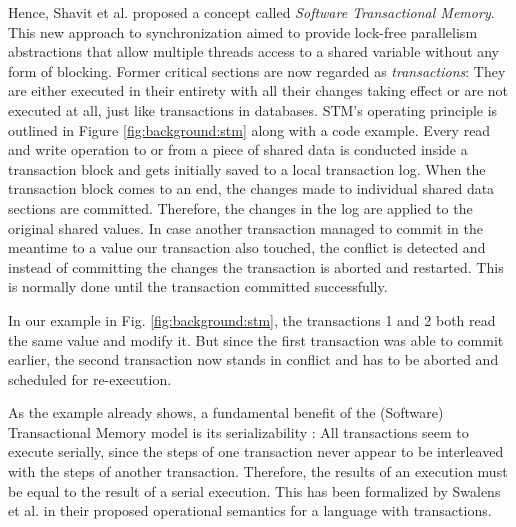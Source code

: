 Hence, Shavit et al. \cite{shavit1997software} proposed a concept called \emph{Software Transactional Memory}.
This new approach to synchronization aimed to provide lock-free parallelism abstractions that allow multiple threads access to a shared variable without any form of blocking.
Former critical sections are now regarded as \emph{transactions}: They are either executed in their entirety with all their changes taking effect or are not executed at all, just like transactions in databases.
STM's operating principle is outlined in Figure \ref{fig:background:stm} along with a code example.
Every read and write operation to or from a piece of shared data is conducted inside a transaction block and gets initially saved to a local transaction log.
When the transaction block comes to an end, the changes made to individual shared data sections are committed.
Therefore, the changes in the log are applied to the original shared values.
In case another transaction managed to commit in the meantime to a value our transaction also touched, the conflict is detected and instead of committing the changes the transaction is aborted and restarted.
This is normally done until the transaction committed successfully.

In our example in Fig. \ref{fig:background:stm}, the transactions 1 and 2 both read the same value and modify it.
But since the first transaction was able to commit earlier, the second transaction now stands in conflict and has to be aborted and scheduled for re-execution.

As the example already shows, a fundamental benefit of the (Software) Transactional Memory model is its serializability \cite{swalens2016transactional}:
All transactions seem to execute serially, since the steps of one transaction never appear to be interleaved with the steps of another transaction.
Therefore, the results of an execution must be equal to the result of a serial execution.
This has been formalized by Swalens et al. \cite{swalens2016transactional} in their proposed operational semantics for a language with transactions.

